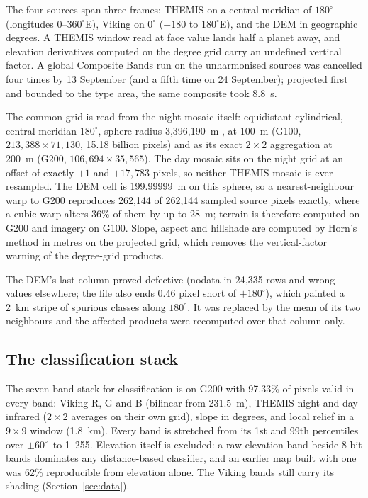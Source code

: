 \documentclass[twocolumn]{aastex701}
\newcommand{\pmsixty}{$\pm60^{\circ}$}
\begin{document}
The four sources span three frames: THEMIS on a central meridian of $180^{\circ}$ (longitudes $0$--$360^{\circ}$E),
Viking on $0^{\circ}$ ($-180$ to $180^{\circ}$E), and the DEM in geographic degrees. A THEMIS window read at face value
lands half a planet away, and elevation derivatives computed on the degree grid carry an undefined vertical factor. A
global Composite Bands run on the unharmonised sources was cancelled four times by 13 September (and a fifth time on 24
September); projected first and bounded to the type area, the same composite took 8.8~s. %

The common grid is read from the night mosaic itself: equidistant cylindrical, central meridian $180^{\circ}$, sphere
radius 3,396,190~m \citep{Archinal2018}, at 100~m (G100, $213{,}388\times71{,}130$, 15.18 billion pixels) and as its
exact $2\times2$ aggregation at 200~m (G200, $106{,}694\times35{,}565$). The day mosaic sits on the night grid at an
offset of exactly $+1$ and $+17{,}783$ pixels, so neither THEMIS mosaic is ever resampled. The DEM cell is
199.99999~m on this sphere, so a nearest-neighbour warp to G200 reproduces 262,144 of 262,144 sampled source pixels
exactly, where a cubic warp alters 36\% of them by up to 28~m; terrain is therefore computed on G200 and imagery on
G100. Slope, aspect and hillshade are computed by Horn's method \citep{Horn1981} in metres on the projected grid, which removes the vertical-factor
warning of the degree-grid products. %

The DEM's last column proved defective (nodata in 24,335 rows and wrong values elsewhere; the file also ends 0.46
pixel short of $+180^{\circ}$), which painted a 2~km stripe of spurious classes along $180^{\circ}$. It was replaced
by the mean of its two neighbours and the affected products were recomputed over that column only. %

\subsection{The classification stack}

The seven-band stack for classification is on G200 with 97.33\% of pixels valid in every band: Viking R, G and B
(bilinear from 231.5~m), THEMIS night and day infrared ($2\times2$ averages on their own grid), slope in degrees, and
local relief in a $9\times9$ window (1.8~km). Every band is stretched from its 1st and 99th percentiles over \pmsixty\
to 1--255. Elevation itself is excluded: a raw elevation band beside 8-bit bands dominates any distance-based classifier,
and an earlier map built with one was 62\% reproducible from elevation alone. The Viking bands still carry its
shading (Section~\ref{sec:data}). %
\end{document}
